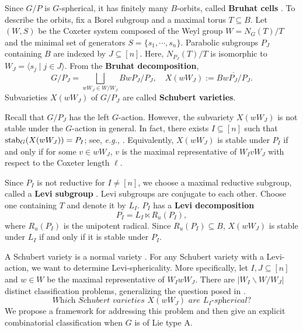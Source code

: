 \documentclass[12pt]{amsart}
\theoremstyle{definition}
\theoremstyle{remark}
\begin{document}
Since $G/P$ is $G$-spherical, it has finitely many $B$-orbits, called \textbf{Bruhat cells} \cite[\S 14]{MR1102012}. To describe the orbits, fix a Borel subgroup and a maximal torus $T \subseteq B$. Let $(W,S)$ be the Coxeter system composed of the Weyl group $W= N_G(T)/T$ and the minimal set of generators $S = \{s_1 , \cdots , s_n\}$. Parabolic subgroups $P_J$ containing $B$ are indexed by $J \subseteq [n]$. Here, $N_{P_J}(T)/T$ is isomorphic to $W_J = \langle s_j \mid j \in J \rangle$. From the \textbf{Bruhat decomposition},
\begin{equation}
G/P_J = \bigsqcup_{wW_J \in W/W_J} BwP_J / P_J , \quad X(wW_J):= \overline{BwP_J / P_J }.
\end{equation}
Subvarieties $X(wW_J)$ of $G/P_J$ are called \textbf{Schubert varieties}.

Recall that $G/P_J$ has the left $G$-action. However, the subvariety $X(wW_J)$ is not stable under the $G$-action in general. In fact, there exists $I \subseteq [n]$ such that ${\rm stab}_G(X(wW_J)) = P_I$; see, \textit{e.g.}, \cite[\S 1.2]{MR4394321}. Equivalently, $X(wW_J)$ is stable under $P_I$ if and only if for some $v \in wW_J$, $v$ is the maximal representative of $W_I v W_J$ with respect to the Coxeter length $\ell$.

Since $P_I$ is not reductive for $I \neq [n]$, we choose a maximal reductive subgroup, called a \textbf{Levi subgroup} \cite[\S 11]{MR1102012}. Levi subgroups are conjugate to each other. Choose one containing $T$ and denote it by $L_I$. $P_I$ has a \textbf{Levi decomposition}
\begin{equation}
P_I = L_I \ltimes R_u(P_I),
\end{equation}
where $R_u(P_I)$ is the unipotent radical. Since $R_u(P_I) \subseteq B$, $X(wW_J)$ is stable under $L_I$ if and only if it is stable under $P_I$.

A Schubert variety is a normal variety \cite[Theorem 4.7]{MR0630769}. For any Schubert variety with a Levi-action, we want to determine Levi-sphericality. More specifically, let $I , J \subseteq [n]$ and $w \in W$ be the maximal representative of $W_I w W_J$. There are $| W_I \backslash W / W_J|$ distinct classification problems, generalizing the question posed in \cite[Definition 1.8]{MR4394321}. 
\begin{equation}\label{eqn1.9}
\textit{Which Schubert varieties $X(wW_J)$ are $L_I$-spherical?}
\end{equation}
We propose a framework for addressing this problem and then give an explicit combinatorial classification when $G$ is of Lie type A.
\end{document}
